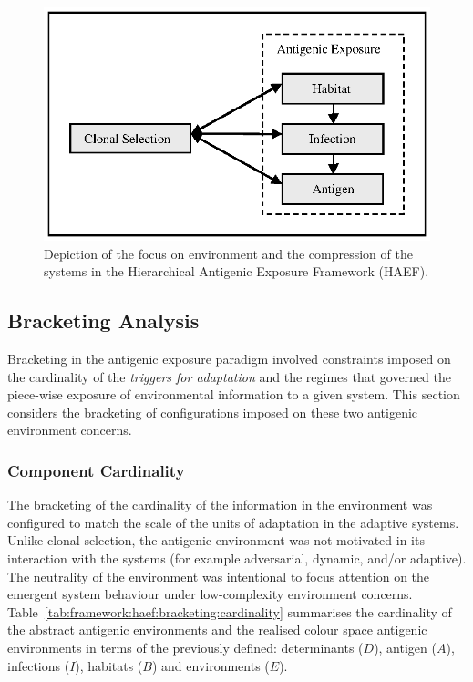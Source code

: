 \begin{figure}[htp]
	\centering
	\includegraphics[scale=0.85]{Framework/framework-integration-flat-expanded}
	\caption{Depiction of the focus on environment and the compression of the systems in the Hierarchical Antigenic Exposure Framework (HAEF).}
	\label{fig:framework:haef:interpretation:flat-expanded}
\end{figure}

%
%
\subsection{Bracketing Analysis}
\label{sec:framework:haef:bracketing}
Bracketing in the antigenic exposure paradigm involved constraints imposed on the cardinality of the \emph{triggers for adaptation} and the regimes that governed the piece-wise exposure of environmental information to a given system. This section considers the bracketing of configurations imposed on these two antigenic environment concerns.

%
%
\subsubsection{Component Cardinality}
The bracketing of the cardinality of the information in the environment was configured to match the scale of the units of adaptation in the adaptive systems. Unlike clonal selection, the antigenic environment was not motivated in its interaction with the systems (for example adversarial, dynamic, and/or adaptive). The neutrality of the environment was intentional to focus attention on the emergent system behaviour under low-complexity environment concerns. 
Table~\ref{tab:framework:haef:bracketing:cardinality} summarises the cardinality of the abstract antigenic environments and the realised colour space antigenic environments in terms of the previously defined: determinants ($D$), antigen ($A$), infections ($I$), habitats ($B$) and environments ($E$). 

